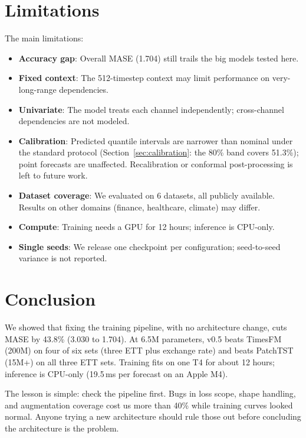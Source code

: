 \documentclass[11pt]{article}
\begin{document}
\section{Limitations}
\label{sec:limitations}

The main limitations:

\begin{itemize}
\item \textbf{Accuracy gap}: Overall MASE (1.704) still trails the big models tested here.
\item \textbf{Fixed context}: The 512-timestep context may limit performance on very-long-range dependencies.
\item \textbf{Univariate}: The model treats each channel independently; cross-channel dependencies are not modeled.
\item \textbf{Calibration}: Predicted quantile intervals are narrower than nominal under the standard protocol (Section~\ref{sec:calibration}: the 80\% band covers 51.3\%); point forecasts are unaffected. Recalibration or conformal post-processing is left to future work.
\item \textbf{Dataset coverage}: We evaluated on 6 datasets, all publicly available. Results on other domains (finance, healthcare, climate) may differ.
\item \textbf{Compute}: Training needs a GPU for 12 hours; inference is CPU-only.
\item \textbf{Single seeds}: We release one checkpoint per configuration; seed-to-seed variance is not reported.
\end{itemize}

\section{Conclusion}
\label{sec:conclusion}

We showed that fixing the training pipeline, with no architecture change, cuts MASE by 43.8\% (3.030 to 1.704). At 6.5M parameters, v0.5 beats TimesFM (200M) on four of six sets (three ETT plus exchange rate) and beats PatchTST (15M+) on all three ETT sets. Training fits on one T4 for about 12 hours; inference is CPU-only (19.5\,ms per forecast on an Apple M4).

The lesson is simple: check the pipeline first. Bugs in loss scope, shape handling, and augmentation coverage cost us more than 40\% while training curves looked normal. Anyone trying a new architecture should rule those out before concluding the architecture is the problem.
\end{document}
